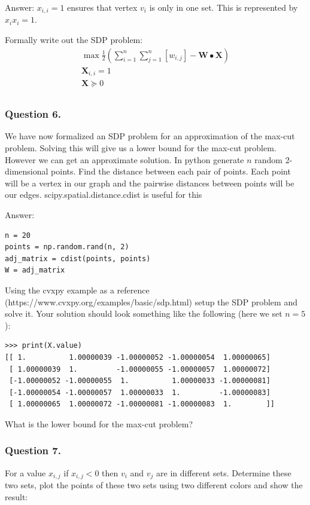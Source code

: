 \documentclass{article}
\begin{document}
Answer: \( x_{i, i} = 1 \) ensures that vertex \( v_i \) is only in one set. This is represented by \( x_i x_i = 1 \).

Formally write out the SDP problem:
\begin{gather*}
\max \frac{1}{2} \left ( \sum_{i = 1}^n \sum_{j = 1}^n[w_{i, j}] - \mathbf{W} \bullet \mathbf{X} \right ) \\
\mathbf{X}_{i, i} = 1 \\
\mathbf{X} \succeq 0 \\
\end{gather*}

\subsubsection{Question 6.}
We have now formalized an SDP problem for an approximation of the max-cut problem. Solving this will give us a lower bound for the max-cut problem. However we can get an approximate solution.
In python generate \( n \) random 2-dimensional points.
Find the distance between each pair of points. Each point will be a vertex in our graph and the pairwise distances between points will be our edges.
scipy.spatial.distance.cdist is useful for this

Answer:
\begin{verbatim}
n = 20
points = np.random.rand(n, 2)
adj_matrix = cdist(points, points)
W = adj_matrix
\end{verbatim}

Using the cvxpy example as a reference (https://www.cvxpy.org/examples/basic/sdp.html) setup the SDP problem and solve it.
Your solution should look something like the following (here we set \( n = 5 \)):

\begin{verbatim}
>>> print(X.value)
[[ 1.          1.00000039 -1.00000052 -1.00000054  1.00000065]
 [ 1.00000039  1.         -1.00000055 -1.00000057  1.00000072]
 [-1.00000052 -1.00000055  1.          1.00000033 -1.00000081]
 [-1.00000054 -1.00000057  1.00000033  1.         -1.00000083]
 [ 1.00000065  1.00000072 -1.00000081 -1.00000083  1.        ]]
\end{verbatim}

What is the lower bound for the max-cut problem?

\subsubsection{Question 7.}
For a value \( x_{i, j} \) if \( x_{i, j} < 0 \) then \( v_i \) and \( v_j \) are in different sets.
Determine these two sets, plot the points of these two sets using two different colors and show the result:
\end{document}
